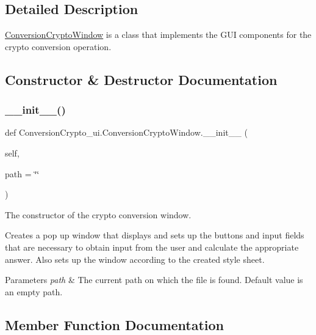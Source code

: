 \subsection{Detailed Description}
\hyperlink{class_conversion_crypto__ui_1_1_conversion_crypto_window}{Conversion\+Crypto\+Window} is a class that implements the G\+UI components for the crypto conversion operation. 

\subsection{Constructor \& Destructor Documentation}
\mbox{\label{class_conversion_crypto__ui_1_1_conversion_crypto_window_a2c076dd5a4c7905c9e8898ace06516ad}} 
\subsubsection{\texorpdfstring{\+\_\+\+\_\+init\+\_\+\+\_\+()}{\_\_init\_\_()}}
{\footnotesize\ttfamily def Conversion\+Crypto\+\_\+ui.\+Conversion\+Crypto\+Window.\+\_\+\+\_\+init\+\_\+\+\_\+ (\begin{DoxyParamCaption}\item[{}]{self,  }\item[{}]{path = {\ttfamily \char`\"{}\char`\"{}} }\end{DoxyParamCaption})}



The constructor of the crypto conversion window. 

Creates a pop up window that displays and sets up the buttons and input fields that are necessary to obtain input from the user and calculate the appropriate answer. Also sets up the window according to the created style sheet. 
\begin{DoxyParams}{Parameters}
{\em path} & The current path on which the file is found. Default value is an empty path. \\
\hline
\end{DoxyParams}


\subsection{Member Function Documentation}
\mbox{\label{class_conversion_crypto__ui_1_1_conversion_crypto_window_a1348e819d5c05e07ccf156235ba333e9}} 
